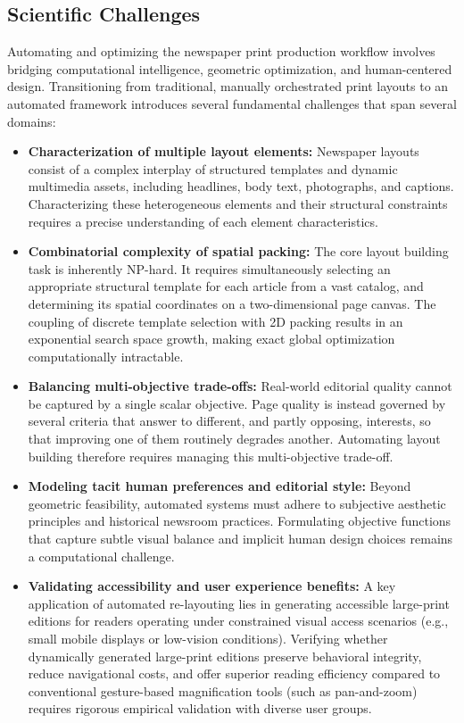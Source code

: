 \subsection{Scientific Challenges}
\label{sec:challenges}

Automating and optimizing the newspaper print production workflow involves bridging computational intelligence, geometric optimization, and human-centered design. Transitioning from traditional, manually orchestrated print layouts to an automated framework introduces several fundamental challenges that span several domains:

\begin{itemize}
    \item \textbf{Characterization of multiple layout elements:} Newspaper layouts consist of a complex interplay of structured templates and dynamic multimedia assets, including headlines, body text, photographs, and captions. Characterizing these heterogeneous elements and their structural constraints requires a precise understanding of each element characteristics.

    \item \textbf{Combinatorial complexity of spatial packing:} The core layout building task is inherently NP-hard. It requires simultaneously selecting an appropriate structural template for each article from a vast catalog, and determining its spatial coordinates on a two-dimensional page canvas. The coupling of discrete template selection with 2D packing results in an exponential search space growth, making exact global optimization computationally intractable.

    \item \textbf{Balancing multi-objective trade-offs:} Real-world editorial quality cannot be captured by a single scalar objective. Page quality is instead governed by several criteria that answer to different, and partly opposing, interests, so that improving one of them routinely degrades another. Automating layout building therefore requires managing this multi-objective trade-off.

    \item \textbf{Modeling tacit human preferences and editorial style:} Beyond geometric feasibility, automated systems must adhere to subjective aesthetic principles and historical newsroom practices. Formulating objective functions that capture subtle visual balance and implicit human design choices remains a computational challenge.

    \item \textbf{Validating accessibility and user experience benefits:} A key application of automated re-layouting lies in generating accessible large-print editions for readers operating under constrained visual access scenarios (e.g., small mobile displays or low-vision conditions). Verifying whether dynamically generated large-print editions preserve behavioral integrity, reduce navigational costs, and offer superior reading efficiency compared to conventional gesture-based magnification tools (such as pan-and-zoom) requires rigorous empirical validation with diverse user groups.


\end{itemize}
